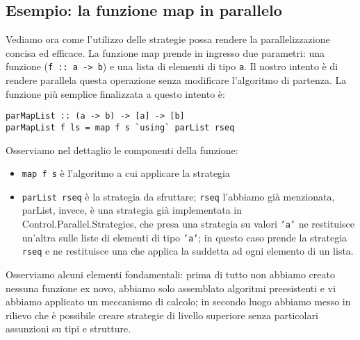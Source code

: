 \subsection{Esempio: la funzione map in parallelo}
Vediamo ora come l'utilizzo delle strategie possa rendere la parallelizzazione concisa ed efficace. La funzione map prende in ingresso due parametri: una funzione (\texttt{f :: a -> b}) e una lista di elementi di tipo \texttt{a}. Il nostro intento è di rendere parallela questa operazione senza modificare l'algoritmo di partenza.\newpage
\noindent
La funzione più semplice finalizzata a questo intento è:
\begin{verbatim}
parMapList :: (a -> b) -> [a] -> [b]
parMapList f ls = map f s `using` parList rseq
\end{verbatim}
Osserviamo nel dettaglio le componenti della funzione:
\begin{itemize}
\item{\texttt{map f s} è l'algoritmo a cui applicare la strategia}
\item{\texttt{parList rseq} è la strategia da sfruttare; \texttt{rseq} l'abbiamo già menzionata, parList, invece, è una strategia già implementata in Control.Parallel.Strategies, che presa una strategia su valori \texttt{'a'} ne restituisce un'altra sulle liste di elementi di tipo \texttt{'a'}; in questo caso prende la strategia \texttt{rseq} e ne restituisce una che applica la suddetta ad ogni elemento di un lista.}
\end{itemize}
Osserviamo alcuni elementi fondamentali: prima di tutto non abbiamo creato nessuna funzione ex novo, abbiamo solo assemblato algoritmi preesistenti e vi abbiamo applicato un meccanismo di calcolo; in secondo luogo abbiamo messo in rilievo che è possibile creare strategie di livello superiore senza particolari assunzioni su tipi e strutture.

